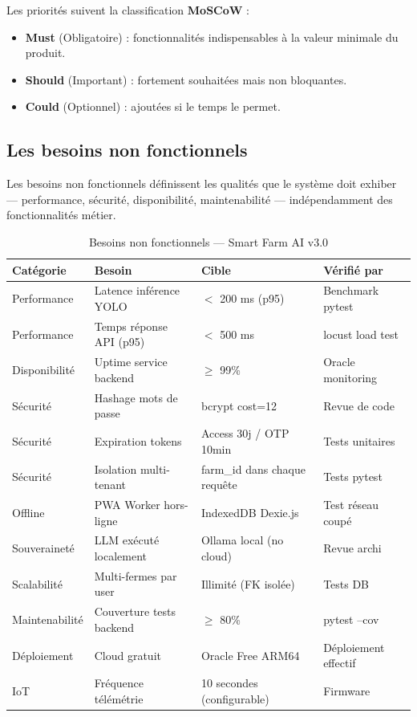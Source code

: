 \noindent Les priorités suivent la classification \textbf{MoSCoW} :
\begin{itemize}
  \item \textbf{Must} (Obligatoire) : fonctionnalités indispensables à la valeur
        minimale du produit.
  \item \textbf{Should} (Important) : fortement souhaitées mais non bloquantes.
  \item \textbf{Could} (Optionnel) : ajoutées si le temps le permet.
\end{itemize}

\subsection{Les besoins non fonctionnels}

Les besoins non fonctionnels définissent les qualités que le système doit exhiber
— performance, sécurité, disponibilité, maintenabilité — indépendamment des
fonctionnalités métier.

\begin{table}[H]\centering
\caption{Besoins non fonctionnels — Smart Farm AI v3.0}
\label{tab:bnf}
\begin{tabular}{llll}
\toprule
\textbf{Catégorie} & \textbf{Besoin} & \textbf{Cible} & \textbf{Vérifié par} \\
\midrule
Performance   & Latence inférence YOLO      & $<$ 200 ms (p95)   & Benchmark pytest \\
Performance   & Temps réponse API (p95)     & $<$ 500 ms         & locust load test \\
Disponibilité & Uptime service backend      & $\geq$ 99\%        & Oracle monitoring \\
Sécurité      & Hashage mots de passe       & bcrypt cost=12     & Revue de code \\
Sécurité      & Expiration tokens           & Access 30j / OTP 10min & Tests unitaires \\
Sécurité      & Isolation multi-tenant      & farm\_id dans chaque requête & Tests pytest \\
Offline       & PWA Worker hors-ligne       & IndexedDB Dexie.js & Test réseau coupé \\
Souveraineté  & LLM exécuté localement      & Ollama local (no cloud) & Revue archi \\
Scalabilité   & Multi-fermes par user       & Illimité (FK isolée) & Tests DB \\
Maintenabilité & Couverture tests backend   & $\geq$ 80\%        & pytest --cov \\
Déploiement   & Cloud gratuit               & Oracle Free ARM64  & Déploiement effectif \\
IoT           & Fréquence télémétrie        & 10 secondes (configurable) & Firmware \\
\bottomrule
\end{tabular}
\end{table}

